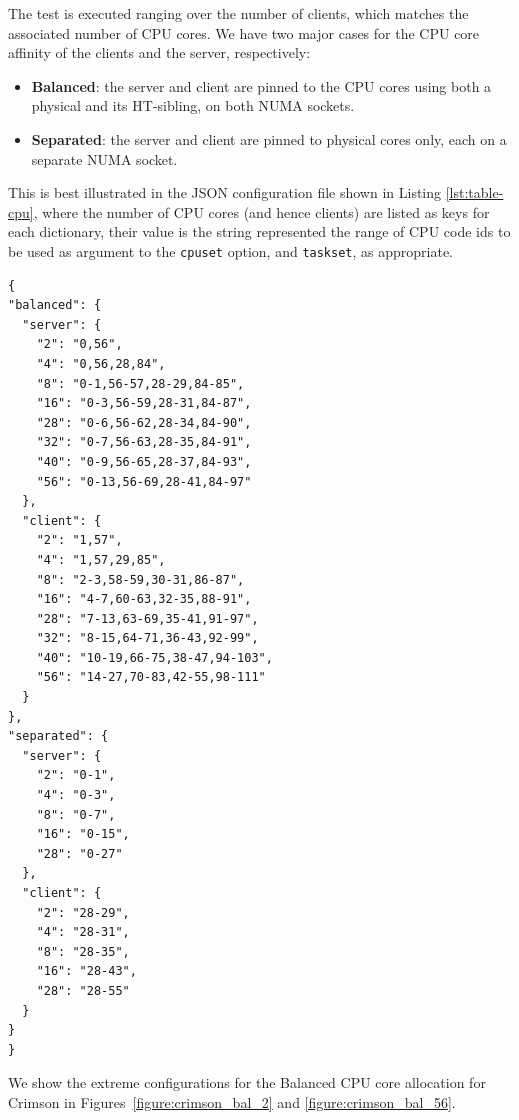 The test is executed ranging over the number of clients, which matches the
associated number of CPU cores. We have two major cases for the CPU core
affinity of the clients and the server, respectively:
\begin{itemize}
\item \textbf{Balanced}: the server and client are pinned to the CPU cores
using both a physical and its HT-sibling, on both NUMA sockets.
\item \textbf{Separated}: the server  and client are pinned to physical cores only, 
each on a separate NUMA socket.
\end{itemize}
This is best illustrated in the JSON configuration file shown in Listing
\ref{lst:table-cpu}, where the number of CPU cores (and hence clients) are
listed as keys for each dictionary, their value is the string represented the
range of CPU code ids to be used as argument to the \texttt{cpuset} option, and
\texttt{taskset}, as appropriate.

\begin{lstlisting}[language={[3]Python}, caption=Range of clients and their CPU set, label=lst:table-cpu]
{
"balanced": {
  "server": {
    "2": "0,56",
    "4": "0,56,28,84",
    "8": "0-1,56-57,28-29,84-85",
    "16": "0-3,56-59,28-31,84-87",
    "28": "0-6,56-62,28-34,84-90",
    "32": "0-7,56-63,28-35,84-91",
    "40": "0-9,56-65,28-37,84-93",
    "56": "0-13,56-69,28-41,84-97"
  },
  "client": {
    "2": "1,57",
    "4": "1,57,29,85",
    "8": "2-3,58-59,30-31,86-87",
    "16": "4-7,60-63,32-35,88-91",
    "28": "7-13,63-69,35-41,91-97",
    "32": "8-15,64-71,36-43,92-99",
    "40": "10-19,66-75,38-47,94-103",
    "56": "14-27,70-83,42-55,98-111"
  }
},
"separated": {
  "server": {
    "2": "0-1",
    "4": "0-3",
    "8": "0-7",
    "16": "0-15",
    "28": "0-27"
  },
  "client": {
    "2": "28-29",
    "4": "28-31",
    "8": "28-35",
    "16": "28-43",
    "28": "28-55"
  }
}
}
\end{lstlisting}

We show the extreme configurations for the Balanced CPU core allocation for
Crimson in Figures~\ref{figure:crimson_bal_2} and \ref{figure:crimson_bal_56}.

